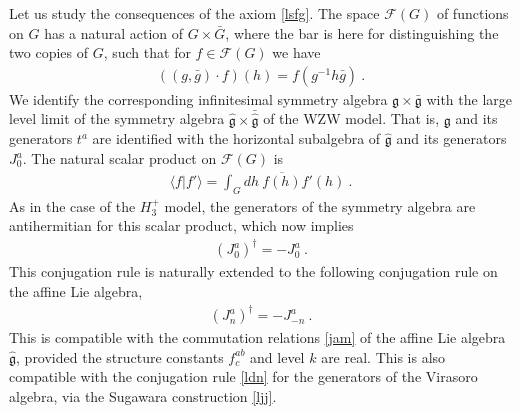 \documentclass[12pt,a4paper,notitlepage]{report}
\numberwithin{equation}{section}
\theoremstyle{break}
\begin{document}
Let us study the consequences of the axiom \eqref{lsfg}.
The space $\mathcal{F}(G)$ of functions on $G$ has a natural action of 
$G\times \bar{G}$, where the bar is here for distinguishing the two copies of $G$, such that for $f\in \mathcal{F}(G)$ we have 
\begin{align}
\left( (g,\bar{g})\cdot f\right)(h) = f(g^{-1}h\bar{g})\ .
\end{align}
We identify the corresponding infinitesimal symmetry algebra $\mathfrak{g}\times \bar{\mathfrak{g}}$ with the large level limit of the symmetry algebra $\hat{\mathfrak{g}}\times \bar{\hat{\mathfrak{g}}}$ of the WZW model.
That is, $\mathfrak{g}$ and its generators $t^a$ are identified with the horizontal subalgebra of $\hat{\mathfrak{g}}$ and its generators $J^a_0$.
The natural scalar product on $\mathcal{F}(G)$ is 
\begin{align}
 \langle f|f'\rangle = \int_G dh\ \overline{f(h)} f'(h)\ .
\label{gbg}
\end{align}
As in the case of the $H_3^+$ model, the generators of the symmetry algebra are antihermitian for this scalar product, which now implies
\begin{align}
 (J^a_0)^\dagger = -J^a_0\  . 
\label{jzdj}
\end{align}
This conjugation rule is naturally extended to the following conjugation rule on the affine Lie algebra,
\begin{align}
 \boxed{(J^a_n)^\dagger = -J^a_{-n}}\ .
\end{align}
This is compatible with the commutation relations \eqref{jam} of the affine Lie algebra $\hat{\mathfrak{g}}$, provided the structure constants $f^{ab}_c$ and level $k$ are real.
This is also compatible with the conjugation rule \eqref{ldn} for the generators of the Virasoro algebra, via the Sugawara construction \eqref{ljj}.
\end{document}
